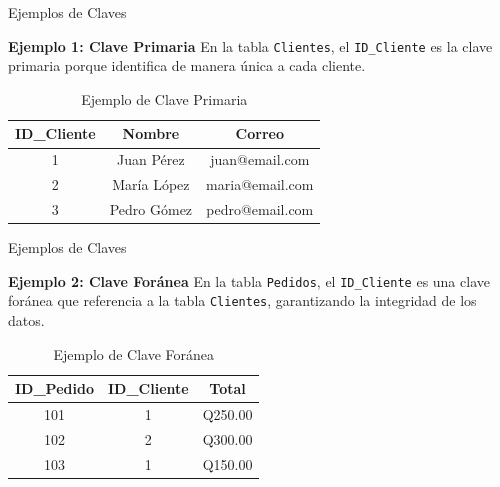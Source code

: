 \documentclass[spanish]{beamer}
\begin{document}
\begin{frame}{Ejemplos de Claves}
    \begin{tcolorbox}[title=Ejemplos de Claves,colback=gray!5!white,colframe=gray!75!black]
        \textbf{Ejemplo 1: Clave Primaria}  
        En la tabla \texttt{Clientes}, el \texttt{ID\_Cliente} es la clave primaria porque identifica de manera única a cada cliente.  

        \begin{table}[]
            \centering
            \begin{tabular}{|c|c|c|}
                \hline
                \textbf{ID\_Cliente} & \textbf{Nombre}  & \textbf{Correo}          \\
                \hline
                1           & Juan Pérez  & juan@email.com    \\
                2           & María López & maria@email.com   \\
                3           & Pedro Gómez & pedro@email.com   \\
                \hline
            \end{tabular}
            \caption{Ejemplo de Clave Primaria}
        \end{table}

    \end{tcolorbox}
\end{frame}

\begin{frame}{Ejemplos de Claves}
    \begin{tcolorbox}[title=Ejemplos de Claves,colback=gray!5!white,colframe=gray!75!black]
        \textbf{Ejemplo 2: Clave Foránea}  
        En la tabla \texttt{Pedidos}, el \texttt{ID\_Cliente} es una clave foránea que referencia a la tabla \texttt{Clientes}, garantizando la integridad de los datos.

        \begin{table}[]
            \centering
            \begin{tabular}{|c|c|c|}
                \hline
                \textbf{ID\_Pedido} & \textbf{ID\_Cliente} & \textbf{Total} \\
                \hline
                101         & 1             & Q250.00  \\
                102         & 2             & Q300.00  \\
                103         & 1             & Q150.00  \\
                \hline
            \end{tabular}
            \caption{Ejemplo de Clave Foránea}
        \end{table}
    \end{tcolorbox}
\end{frame}
\end{document}
